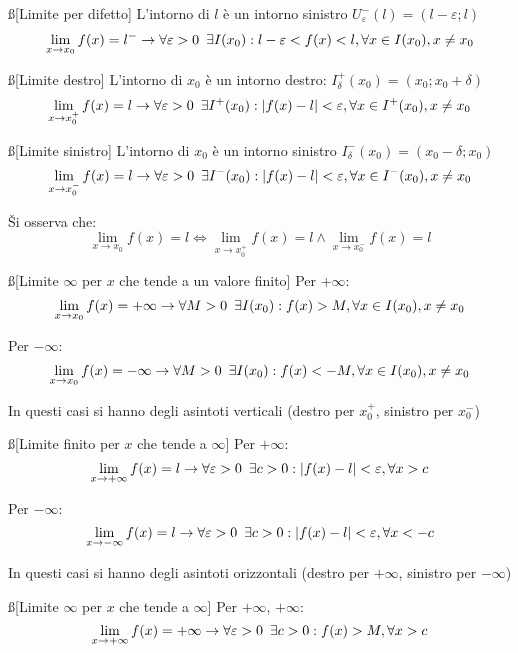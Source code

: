 \documentclass[12pt]{article}
\begin{document}
\ss[Limite per difetto]
L'intorno di $l$ è un intorno sinistro $U_{\varepsilon}^{-}(l) = (l-\varepsilon; l)$
$$ \lim_{x \to x_0} f(x) = l^{-} \rightarrow \forall \varepsilon > 0 \hspace{0.5em} \exists I(x_0): l - \varepsilon < f(x) < l, \forall x \in I(x_0), x\neq x_0 $$

\ss[Limite destro]
L'intorno di $x_0$ è un intorno destro: $I_{\delta}^{+}(x_0) = (x_0; x_0+\delta)$
$$ \lim_{x \to x_0^{+}} f(x) = l \rightarrow \forall \varepsilon > 0 \hspace{0.5em} \exists I^{+}(x_0): |f(x) - l| < \varepsilon, \forall x \in I^{+}(x_0), x\neq x_0 $$

\ss[Limite sinistro]
L'intorno di $x_0$ è un intorno sinistro $I_{\delta}^{-}(x_0) = (x_0-\delta; x_0)$
$$ \lim_{x \to x_0^{-}} f(x) = l \rightarrow \forall \varepsilon > 0 \hspace{0.5em} \exists I^{-}(x_0): |f(x) - l| < \varepsilon, \forall x \in I^{-}(x_0), x\neq x_0 $$

\v

Si osserva che:
$$ \lim_{x \to x_0} f(x) = l \iff  \lim_{x \to x_0^{+}} f(x) = l \wedge \lim_{x \to x_0^{-}} f(x) = l $$

\ss[Limite $\infty$ per $x$ che tende a un valore finito]
Per $+\infty$:
$$ \lim_{x \to x_0} f(x) = +\infty \rightarrow \forall M > 0 \hspace{0.5em} \exists I(x_0): f(x) > M, \forall x \in I(x_0), x\neq x_0 $$

Per $-\infty$:
$$ \lim_{x \to x_0} f(x) = -\infty \rightarrow \forall M > 0 \hspace{0.5em} \exists I(x_0): f(x) < -M, \forall x \in I(x_0), x\neq x_0 $$

In questi casi si hanno degli asintoti verticali (destro per $x_0^{+}$, sinistro per $x_0^{-}$)

\ss[Limite finito per $x$ che tende a $\infty$]
Per $+\infty$:
$$ \lim_{x \to +\infty} f(x) = l \rightarrow \forall \varepsilon > 0 \hspace{0.5em} \exists c > 0: |f(x)-l| < \varepsilon, \forall x > c $$

Per $-\infty$:
$$ \lim_{x \to -\infty} f(x) = l \rightarrow \forall \varepsilon > 0 \hspace{0.5em} \exists c > 0: |f(x)-l| < \varepsilon, \forall x < -c $$

In questi casi si hanno degli asintoti orizzontali (destro per $+\infty$, sinistro per $-\infty$)

\ss[Limite $\infty$ per $x$ che tende a $\infty$]
Per $+\infty$, $+\infty$:
$$ \lim_{x \to +\infty} f(x) = +\infty \rightarrow \forall \varepsilon > 0 \hspace{0.5em} \exists c > 0: f(x) > M, \forall x > c $$
\end{document}
